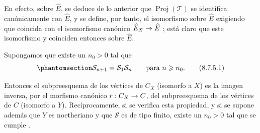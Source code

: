 \documentclass[oneside,10pt]{amsart}
\makeatletter
\newcommand{\ega@arrow}[2]{\mathchoice{#1}{#2}{#2}{#2}}
\renewcommand{\to}{\ega@arrow{\longrightarrow}{\rightarrow}}
\let\EGAOriginalLabel\label
\renewcommand{\label}[1]{\phantomsection\EGAOriginalLabel{#1}}
\makeatother
\begin{document}
\begin{remark}[8.7.4]
\begin{enumerate}
    En efecto, sobre $\widehat{E}$, se deduce de lo anterior que $\operatorname{Proj}(\mathcal{T})$ se identifica canónicamente con $\widehat{E}$, y se define, por tanto, el isomorfismo  sobre $\widehat{E}$ exigiendo que coincida con el isomorfismo canónico $\widehat{E}_X\to\widehat{E}$ ;
    está claro que este isomorfismo y  coinciden entonces sobre $\widehat{E}$.
\end{enumerate}
\end{remark}
\begin{corollary}[8.7.5]
\label{II.8.7.5-fr}
Supongamos que existe un $n_0>0$ tal que
\begin{equation}
\label{II.8.7.5.1-fr}
  \mathcal{S}_{n+1}=\mathcal{S}_1\mathcal{S}_n
  \qquad\text{para }n\geqslant n_0.
\tag{8.7.5.1}
\end{equation}

Entonces el subpreesquema de los vértices de $C_X$ (isomorfo a $X$) es la imagen inversa, por el morfismo canónico $r:C_X\to C$, del subpreesquema de los vértices de $C$ (isomorfo a $Y$).
Recíprocamente, si se verifica esta propiedad, y si se supone además que $Y$ es noetheriano y que $\mathcal{S}$ es de tipo finito, existe un $n_0>0$ tal que se cumple .
\end{corollary}
\end{document}
